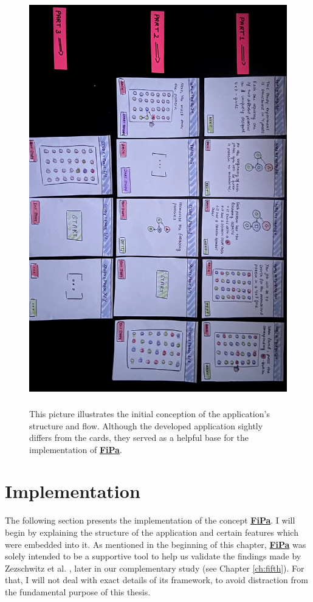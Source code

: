 \begin{figure}[t!]
\centering
\includegraphics[width=15cm, height=18cm]{Chapters/graphics/pitch.jpg}
\caption{This picture illustrates the initial conception of the application's structure and flow. Although the developed application sightly differs from the cards, they served as a helpful base for the implementation of \underline{\textbf{FiPa}}.}
\label{fig:fipapitch}
\end{figure}
   
\section{Implementation} \label{4.3}

The following section presents the implementation of the concept \underline{\textbf{FiPa}}. I will begin by explaining the structure of the application and certain features which were embedded into it. As mentioned in the beginning of this chapter, \underline{\textbf{FiPa}} was solely intended to be a supportive tool to help us validate the findings made by Zezschwitz et al. \cite{Zezschwitz}, later in our complementary study (see Chapter \ref{ch:fifth}). For that, I will not deal with exact details of its framework, to avoid distraction from the fundamental purpose of this thesis.\\

